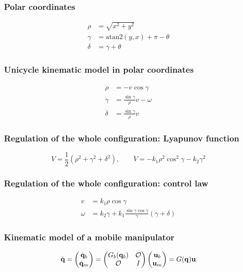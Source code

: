 \subsubsection{Polar coordinates}
\begin{align*}
    \rho&=\sqrt{x^2+y^2}\\
    \gamma&=\text{atan2}(y,x)+\pi-\theta\\
    \delta&=\gamma+\theta
\end{align*}

\subsubsection{Unicycle kinematic model in polar coordinates}
\begin{align*}
    \dot\rho&=-v\cos\gamma\\
    \dot\gamma&=\frac{\sin\gamma}{\rho}v-\omega\\
    \dot\delta&=\frac{\sin\gamma}{\rho}v
\end{align*}

\subsubsection{Regulation of the whole configuration: Lyapunov function}
\begin{equation*}
    V=\frac{1}{2}(\rho^2+\gamma^2+\delta^2),\qquad\dot V=-k_1\rho^2\cos^2\gamma-k_2\gamma^2
\end{equation*}

\subsubsection{Regulation of the whole configuration: control law}
\begin{align*}
    v&=k_1\rho\cos\gamma\\
    \omega&=k_2\gamma+k_1\frac{\sin\gamma\cos\gamma}{\gamma}(\gamma+\delta)
\end{align*}

\subsubsection{Kinematic model of a mobile manipulator}
\begin{equation*}
    {\dot{\mathbf q}}=\begin{pmatrix}{\dot{\mathbf q}}_b\\{\dot{\mathbf q}}_m\end{pmatrix}=\begin{pmatrix}G_b({\mathbf q}_b)&\mathcal O\\\mathcal O&I\end{pmatrix}\begin{pmatrix}\mathbf u_b\\\mathbf u_m\end{pmatrix}=G({\mathbf q})\mathbf u
\end{equation*}

